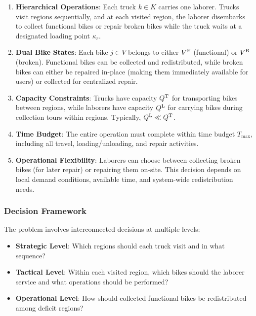 \begin{enumerate}
    \item \textbf{Hierarchical Operations}: Each truck $k \in K$ carries one laborer. Trucks visit regions sequentially, and at each visited region, the laborer disembarks to collect functional bikes or repair broken bikes while the truck waits at a designated loading point $\kappa_r$.

    \item \textbf{Dual Bike States}: Each bike $j \in V$ belongs to either $V^{\text{F}}$ (functional) or $V^{\text{B}}$ (broken). Functional bikes can be collected and redistributed, while broken bikes can either be repaired in-place (making them immediately available for users) or collected for centralized repair.

    \item \textbf{Capacity Constraints}: Trucks have capacity $Q^{\text{T}}$ for transporting bikes between regions, while laborers have capacity $Q^{\text{L}}$ for carrying bikes during collection tours within regions. Typically, $Q^{\text{L}} \ll Q^{\text{T}}$.

    \item \textbf{Time Budget}: The entire operation must complete within time budget $T_{\max}$, including all travel, loading/unloading, and repair activities.

    \item \textbf{Operational Flexibility}: Laborers can choose between collecting broken bikes (for later repair) or repairing them on-site. This decision depends on local demand conditions, available time, and system-wide redistribution needs.
\end{enumerate}

\subsubsection{Decision Framework}

The problem involves interconnected decisions at multiple levels:

\begin{itemize}
    \item \textbf{Strategic Level}: Which regions should each truck visit and in what sequence?
    \item \textbf{Tactical Level}: Within each visited region, which bikes should the laborer service and what operations should be performed?
    \item \textbf{Operational Level}: How should collected functional bikes be redistributed among deficit regions?
\end{itemize}

